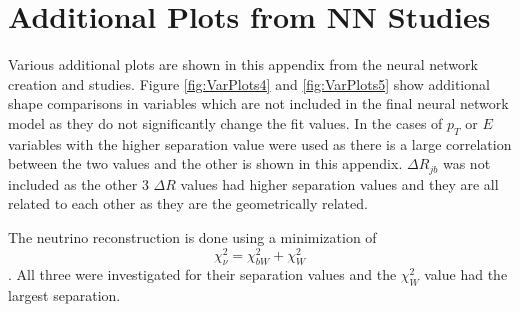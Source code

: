\chapter{Additional Plots from NN Studies}

Various additional plots are shown in this appendix from the neural network creation and studies.  Figure \ref{fig:VarPlots4} and \ref{fig:VarPlots5} show additional shape comparisons in variables which are not included in the final neural network model as they do not significantly change the fit values.  In the cases of $p_T$ or $E$ variables with the higher separation value were used as there is a large correlation between the two values and the other is shown in this appendix.  $\Delta R_{jb}$ was not included as the other 3 $\Delta R$ values had higher separation values and they are all related to each other as they are the geometrically related. 

The neutrino reconstruction is done using a minimization of \[ \chi^2_{\nu} = \chi^2_{bW} + \chi^2_{W} \].  All three were investigated for their separation values and the $\chi^2_{W}$ value had the largest separation.

